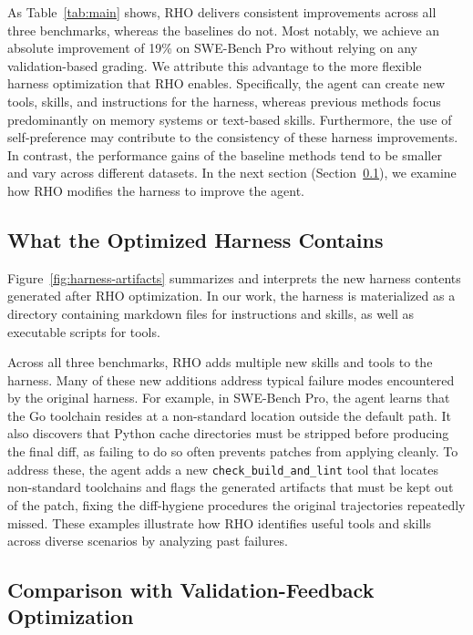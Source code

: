 \documentclass{llmxive}
\providecommand{\method}{\textsc{RHO}}
\begin{document}
As Table~\ref{tab:main} shows, \method{} delivers consistent improvements across all three benchmarks, whereas the baselines do not.
Most notably, we achieve an absolute improvement of 19\% on SWE-Bench Pro without relying on any validation-based grading.
We attribute this advantage to the more flexible harness optimization that \method{} enables.
Specifically, the agent can create new tools, skills, and instructions for the harness, whereas previous methods focus predominantly on memory systems or text-based skills.
Furthermore, the use of self-preference may contribute to the consistency of these harness improvements.
In contrast, the performance gains of the baseline methods tend to be smaller and vary across different datasets.
In the next section (Section~\ref{sec:case-study}), we examine how \method{} modifies the harness to improve the agent.




\subsection{What the Optimized Harness Contains}
\label{sec:case-study}

Figure~\ref{fig:harness-artifacts} summarizes and interprets the new harness contents generated after \method{} optimization.
In our work, the harness is materialized as a directory containing markdown files for instructions and skills, as well as executable scripts for tools.

Across all three benchmarks, \method{} adds multiple new skills and tools to the harness.
Many of these new additions address typical failure modes encountered by the original harness.
For example, in SWE-Bench Pro, the agent learns that the Go toolchain resides at a non-standard location outside the default path.
It also discovers that Python cache directories must be stripped before producing the final diff, as failing to do so often prevents patches from applying cleanly.
To address these, the agent adds a new \texttt{check\_build\_and\_lint} tool that locates non-standard toolchains and flags the generated artifacts that must be kept out of the patch, fixing the diff-hygiene procedures the original trajectories repeatedly missed.
These examples illustrate how \method{} identifies useful tools and skills across diverse scenarios by analyzing past failures.

\subsection{Comparison with Validation-Feedback Optimization}
\end{document}
